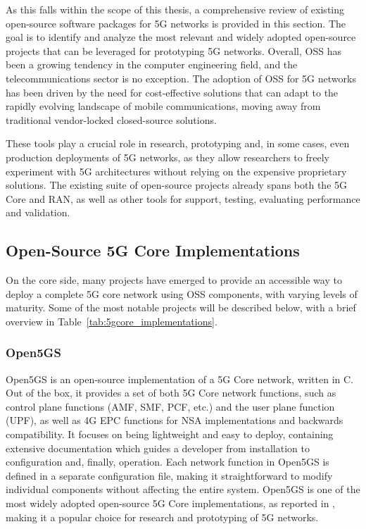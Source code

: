 As this falls within the scope of this thesis, a comprehensive review of existing open-source software packages for 5G networks is provided in this section. The goal is to identify and analyze the most relevant and widely adopted open-source projects that can be leveraged for prototyping 5G networks. Overall, \gls{OSS} has been a growing tendency in the computer engineering field, and the telecommunications sector is no exception. The adoption of \gls{OSS} for 5G networks has been driven by the need for cost-effective solutions that can adapt to the rapidly evolving landscape of mobile communications, moving away from traditional vendor-locked closed-source solutions.

These tools play a crucial role in research, prototyping and, in some cases, even production deployments of 5G networks, as they allow researchers to freely experiment with 5G architectures without relying on the expensive proprietary solutions. The existing suite of open-source projects already spans both the 5G Core and \gls{RAN}, as well as other tools for support, testing, evaluating performance and validation.

\subsection{Open-Source 5G Core Implementations}
\label{sec:open_source_5g_core_implementations}%
On the core side, many projects have emerged to provide an accessible way to deploy a complete 5G core network using \gls{OSS} components, with varying levels of maturity. Some of the most notable projects will be described below, with a brief overview in Table~\ref{tab:5gcore_implementations}.

\subsubsection{Open5GS}
Open5GS \cite{open5gs_repo} is an open-source implementation of a 5G Core network, written in C. Out of the box, it provides a set of both 5G Core network functions, such as control plane functions (\gls{AMF}, \gls{SMF}, \gls{PCF}, etc.) and the user plane function (\gls{UPF}), as well as 4G \gls{EPC} functions for \gls{NSA} implementations and backwards compatibility. It focuses on being lightweight and easy to deploy, containing extensive documentation which guides a developer from installation to configuration and, finally, operation. Each network function in Open5GS is defined in a separate configuration file, making it straightforward to modify individual components without affecting the entire system.
Open5GS is one of the most widely adopted open-source 5G Core implementations, as reported in \cites{bonati2025_5gct}{horstmann2025open5gcube}{mamushiane2023deploying}{tio2025exploring5g}, making it a popular choice for research and prototyping of 5G networks.

